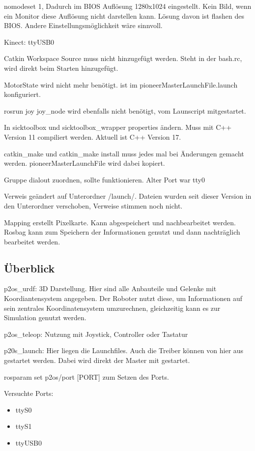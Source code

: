 \documentclass{scrartcl}%
\begin{document}
nomodeset 1, Dadurch im BIOS Auflösung 1280x1024 eingestellt. Kein Bild, wenn ein Monitor diese Auflösung nicht darstellen kann. Lösung davon ist flashen des BIOS. Andere Einstellungsmöglichkeit wäre sinnvoll.

Kinect: ttyUSB0

Catkin Workspace Source muss nicht hinzugefügt werden. Steht in der bash.rc, wird direkt beim Starten hinzugefügt.

MotorState wird nicht mehr benötigt. ist im pioneerMasterLaunchFile.launch konfiguriert.

rosrun joy joy\_node wird ebenfalls nicht benötigt, vom Launscript mitgestartet.

In sicktoolbox und sicktoolbox\_wrapper properties ändern. Muss mit C++ Version 11 compiliert werden. Aktuell ist C++ Version 17.

catkin\_make und catkin\_make install muss jedes mal bei Änderungen gemacht werden. pioneerMasterLaunchFile wird dabei kopiert.

Gruppe dialout zuordnen, sollte funktionieren. Alter Port war tty0

Verweis geändert auf Unterordner /launch/. Dateien wurden seit dieser Version in den Unterordner verschoben, Verweise stimmen noch nicht.

Mapping erstellt Pixelkarte. Kann abgespeichert und nachbearbeitet werden. Rosbag kann zum Speichern der Informationen genutzt und dann nachträglich bearbeitet werden.

\subsection{Überblick}
p2os\_urdf: 3D Darstellung. Hier sind alle Anbauteile und Gelenke mit Koordiantensystem angegeben. Der Roboter nutzt diese, um Informationen auf sein zentrales Koordinatensystem umzurechnen, gleichzeitig kann es zur Simulation genutzt werden.

p2os\_teleop: Nutzung mit Joystick, Controller oder Tastatur

p20s\_launch: Hier liegen die Launchfiles. Auch die Treiber können von hier aus gestartet werden. Dabei wird direkt der Master mit gestartet.

rosparam set p2os/port [PORT] zum Setzen des Ports.

Versuchte Ports: 
\begin{itemize}
	\item ttyS0
	\item ttyS1
	\item ttyUSB0
\end{itemize}
\end{document}
